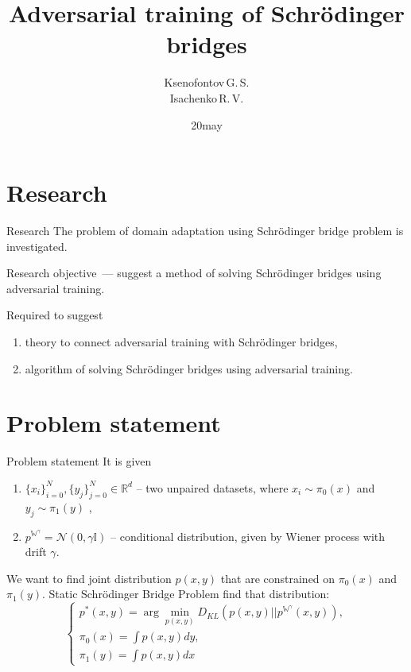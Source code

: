 \documentclass[10pt,pdf,hyperref={unicode}]{beamer}
\title[]{Adversarial training of Schrödinger bridges}
\author{Ksenofontov\,G.\,S.\\[1ex] 
\small Isachenko\,R.\,V.}
\institute[]{Moscow Institute of Physics and Technology}
\date[2023]{\small 20\;may\;2023}
\begin{document}
\begin{frame}
\titlepage
\end{frame}

\section{Research}
\begin{frame}{Research}
\bigskip
The problem of domain adaptation using  Schrödinger bridge problem is investigated.
\begin{block}{Research objective~---}
suggest a method of solving Schrödinger bridges using adversarial training.
\end{block}
\begin{block}{Required to suggest}
\justifying
\begin{enumerate}[1.]
    \item theory to connect adversarial training with Schrödinger bridges,
    \item algorithm of solving Schrödinger bridges using adversarial training.
\end{enumerate}
\end{block}
\end{frame}
\section{Problem statement}
\begin{frame}{Problem statement}
It is given
\begin{enumerate}[1.]
    \item $\{x_i\}_{i=0}^N, \{y_j\}_{j=0}^N \in \mathbb{R}^d$ -- two unpaired datasets,  where $x_i \sim \pi_0(x)$ and $y_j \sim \pi_1(y)$ ,
    \item $p^{\mathbb{W}^\gamma}= \mathcal{N}(0, \gamma\mathbb{I})$ -- conditional distribution, given by Wiener process with drift $\gamma$.
\end{enumerate}


\bigskip
We want to find joint distribution $p(x, y)$ that are constrained on $\pi_0(x)$ and $\pi_1(y)$. Static Schrödinger Bridge Problem find that distribution:
\begin{equation}
    \left\{ \begin{array}{c}
    p^*(x,y) = \arg\min_{p(x,y)} D_{KL}(p(x,y)||p^{\mathbb{W}^\gamma}(x,y)), \\
    \pi_0(x) = \int p(x,y)dy, \\
    \pi_1(y) = \int p(x,y)dx
    \end{array}\right.
    \label{eq:static}
\end{equation}

\end{frame}
\end{document}
